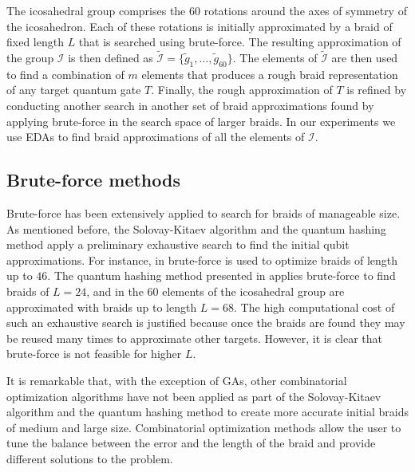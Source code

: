 The icosahedral group comprises the $60$ rotations around the axes of symmetry of the icosahedron. Each of these rotations is initially approximated by a braid of fixed length $L$ that is searched using brute-force. The resulting approximation of the group $\mathcal{I}$ is then defined as $\tilde{\mathcal{I}}=\{\tilde{g}_1,\dots,\tilde{g}_{60}\}$. The elements of $\tilde{\mathcal{I}}$  are then used to find a combination of $m$ elements that produces a rough braid representation of any target quantum gate $T$.  Finally, the rough approximation of $T$ is refined by conducting another search in another set of braid approximations found by applying brute-force in the search space of larger braids. In our experiments we use EDAs to find braid approximations of all the elements of $\mathcal{I}$. 


\subsection{Brute-force methods}


 Brute-force has been extensively applied to search for braids of manageable size. As mentioned before, the  Solovay-Kitaev algorithm and the quantum hashing method apply a preliminary exhaustive search to find the initial qubit approximations. For instance, in  \cite{Bonesteel_et_al:2005} brute-force is used to optimize braids of length up to $46$. The quantum hashing method presented in  \cite{Burrello_et_al:2010} applies brute-force to find braids of $L=24$, and in  \cite{Burrello_et_al:2011} the $60$ elements of the icosahedral group are approximated with braids up to length $L=68$. The high computational cost of such an exhaustive search is justified because once the braids are found they may be reused many times to approximate other targets. However, it is clear that brute-force is not feasible for higher $L$. 

It is remarkable that, with the exception of GAs, other combinatorial optimization algorithms have not been applied as part of the Solovay-Kitaev algorithm and the quantum hashing method to create more accurate initial braids of medium and large size. Combinatorial optimization methods allow  the user to  tune the balance between the error and the length of the braid  and provide different solutions to the problem. 
  


